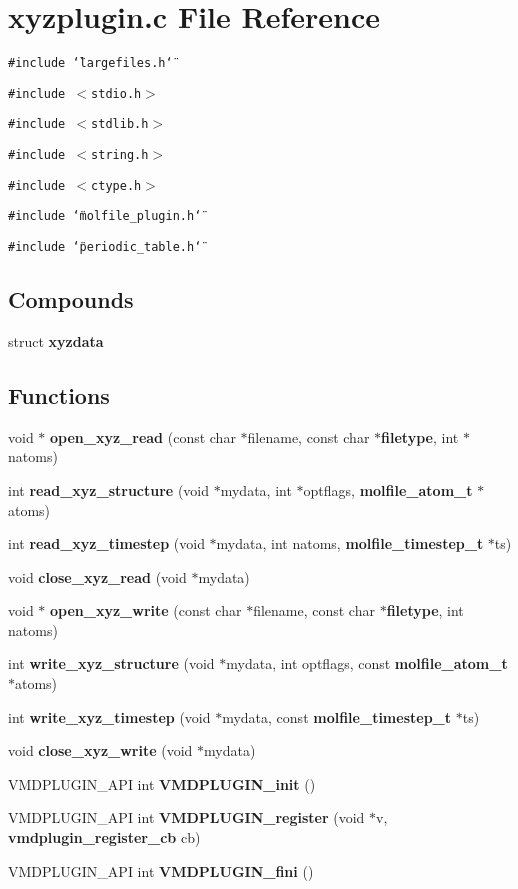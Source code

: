 \section{xyzplugin.c File Reference}
\label{xyzplugin_8c}
{\tt \#include \char`\"{}largefiles.h\char`\"{}}\par
{\tt \#include $<$stdio.h$>$}\par
{\tt \#include $<$stdlib.h$>$}\par
{\tt \#include $<$string.h$>$}\par
{\tt \#include $<$ctype.h$>$}\par
{\tt \#include \char`\"{}molfile\_\-plugin.h\char`\"{}}\par
{\tt \#include \char`\"{}periodic\_\-table.h\char`\"{}}\par
\subsection*{Compounds}
\begin{CompactItemize}
\item 
struct {\bf xyzdata}
\end{CompactItemize}
\subsection*{Functions}
\begin{CompactItemize}
\item 
void $\ast$ {\bf open\_\-xyz\_\-read} (const char $\ast$filename, const char $\ast${\bf filetype}, int $\ast$natoms)
\item 
int {\bf read\_\-xyz\_\-structure} (void $\ast$mydata, int $\ast$optflags, {\bf molfile\_\-atom\_\-t} $\ast$atoms)
\item 
int {\bf read\_\-xyz\_\-timestep} (void $\ast$mydata, int natoms, {\bf molfile\_\-timestep\_\-t} $\ast$ts)
\item 
void {\bf close\_\-xyz\_\-read} (void $\ast$mydata)
\item 
void $\ast$ {\bf open\_\-xyz\_\-write} (const char $\ast$filename, const char $\ast${\bf filetype}, int natoms)
\item 
int {\bf write\_\-xyz\_\-structure} (void $\ast$mydata, int optflags, const {\bf molfile\_\-atom\_\-t} $\ast$atoms)
\item 
int {\bf write\_\-xyz\_\-timestep} (void $\ast$mydata, const {\bf molfile\_\-timestep\_\-t} $\ast$ts)
\item 
void {\bf close\_\-xyz\_\-write} (void $\ast$mydata)
\item 
VMDPLUGIN\_\-API int {\bf VMDPLUGIN\_\-init} ()
\item 
VMDPLUGIN\_\-API int {\bf VMDPLUGIN\_\-register} (void $\ast$v, {\bf vmdplugin\_\-register\_\-cb} cb)
\item 
VMDPLUGIN\_\-API int {\bf VMDPLUGIN\_\-fini} ()
\end{CompactItemize}
